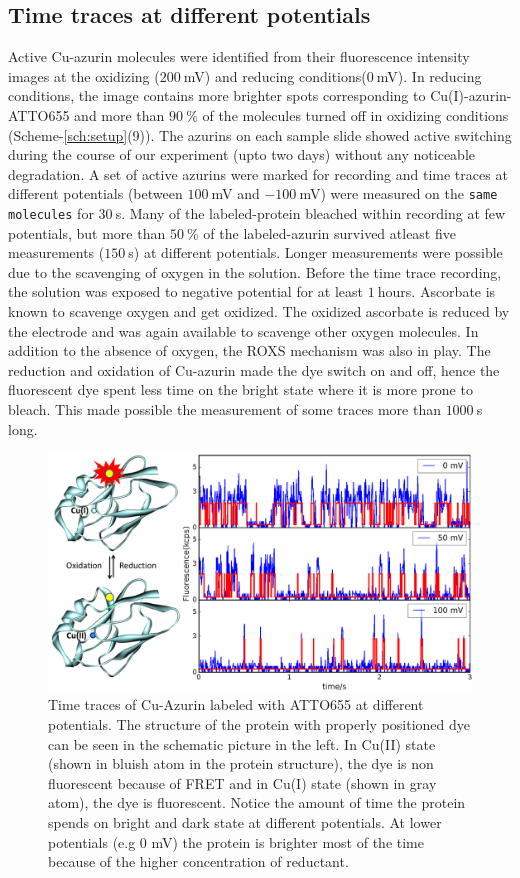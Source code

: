 \documentclass[journal=jacsat,manuscript=article]{achemso}
\begin{document}
\subsection{Time traces at different potentials}
Active Cu-azurin molecules were identified from their fluorescence intensity images at the oxidizing ($200~$mV) and reducing conditions($0~$mV). In reducing conditions, the image contains more brighter spots corresponding to Cu(I)-azurin-ATTO655 and more than $90~$\% of the molecules turned off in oxidizing conditions (Scheme-\ref{sch:setup}(9)). The azurins on each sample slide showed active switching during the course of our experiment (upto two days) without any noticeable degradation. A set of active azurins were marked for recording and time traces at different potentials (between $100~$mV and $-100~$mV) were measured on the \texttt{same molecules} for $30~$s. Many of the labeled-protein bleached within recording at few potentials, but more than $50~$\% of the labeled-azurin survived atleast five measurements ($150~$s) at different potentials. Longer measurements were possible due to the scavenging of oxygen in the solution. Before the time trace recording, the solution was exposed to negative potential for at least $1~$hours. Ascorbate is known to  scavenge oxygen\cite{dave1997effectiveness} and get oxidized. The oxidized ascorbate is reduced by the electrode and was again available to scavenge other oxygen molecules. In addition to the absence of oxygen, the ROXS mechanism was also in play. The reduction and oxidation of Cu-azurin made the dye switch on and off, hence the fluorescent dye spent less time on the bright state where it is more prone to bleach. This made possible the measurement of some traces more than $1000~$s long.\\
\begin{figure}
	\includegraphics[width=\textwidth]{Figure_1_timetrace_CuAzu.eps}
	\caption{Time traces of Cu-Azurin labeled with ATTO655 at different potentials. The structure of the protein with properly positioned dye can be seen in the schematic picture in the left. In Cu(II) state (shown in bluish atom in the protein structure), the dye is non fluorescent because of FRET and in Cu(I) state (shown in gray atom), the dye is fluorescent. Notice the amount of time the protein spends on bright and dark state at different potentials. At lower potentials (e.g 0 mV) the protein is brighter most of the time because of the higher concentration of reductant.}
	\label{fig:timetrace}
\end{figure}
\end{document}
